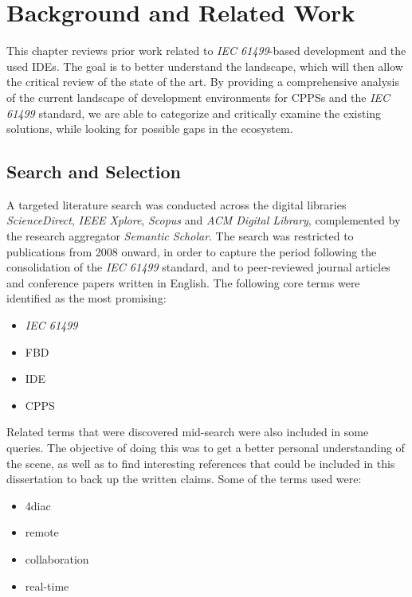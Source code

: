 \chapter{Background and Related Work} \label{chap:background-related-work}
This chapter reviews prior work related to \textit{IEC 61499}-based development and the used \acp{IDE}. The goal is to better understand the landscape, which will then allow the critical review of the state of the art. By providing a comprehensive analysis of the current landscape of development environments for \acp{CPPS} and the \textit{IEC 61499} standard, we are able to categorize and critically examine the existing solutions, while looking for possible gaps in the ecosystem.

\section{Search and Selection} \label{sec:search-selection}
A targeted literature search was conducted across the digital libraries \textit{ScienceDirect}, \textit{IEEE Xplore}, \textit{Scopus} and \textit{ACM Digital Library}, complemented by the research aggregator \textit{Semantic Scholar}. The search was restricted to publications from 2008 onward, in order to capture the period following the consolidation of the \textit{IEC 61499} standard, and to peer-reviewed journal articles and conference papers written in English. The following core terms were identified as the most promising:

\begin{itemize}
  \item \textit{IEC 61499}
  \item \ac{FBD}
  \item \ac{IDE}
  \item \ac{CPPS}
\end{itemize}

Related terms that were discovered mid-search were also included in some queries. The objective of doing this was to get a better personal understanding of the scene, as well as to find interesting references that could be included in this dissertation to back up the written claims. Some of the terms used were:

\begin{itemize}
  \item 4diac
  \item remote
  \item collaboration
  \item real-time
\end{itemize}

